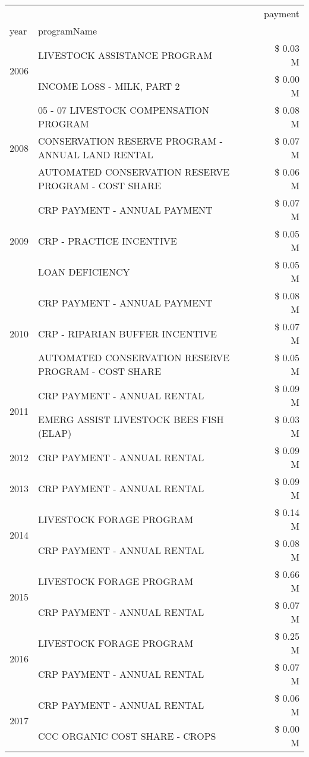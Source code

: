 \begin{tabular}{llr}
\toprule
 &  & payment \\
year & programName &  \\
\midrule
\multirow[t]{2}{*}{2006} & LIVESTOCK ASSISTANCE PROGRAM & \$ 0.03 M \\
 & INCOME LOSS - MILK, PART 2 & \$ 0.00 M \\
\cline{1-3}
\multirow[t]{3}{*}{2008} & 05 - 07 LIVESTOCK COMPENSATION PROGRAM & \$ 0.08 M \\
 & CONSERVATION RESERVE PROGRAM - ANNUAL LAND RENTAL & \$ 0.07 M \\
 & AUTOMATED CONSERVATION RESERVE PROGRAM - COST SHARE & \$ 0.06 M \\
\cline{1-3}
\multirow[t]{3}{*}{2009} & CRP PAYMENT - ANNUAL PAYMENT & \$ 0.07 M \\
 & CRP - PRACTICE INCENTIVE & \$ 0.05 M \\
 & LOAN DEFICIENCY & \$ 0.05 M \\
\cline{1-3}
\multirow[t]{3}{*}{2010} & CRP PAYMENT - ANNUAL PAYMENT & \$ 0.08 M \\
 & CRP - RIPARIAN BUFFER INCENTIVE & \$ 0.07 M \\
 & AUTOMATED CONSERVATION RESERVE PROGRAM - COST SHARE & \$ 0.05 M \\
\cline{1-3}
\multirow[t]{2}{*}{2011} & CRP PAYMENT - ANNUAL RENTAL & \$ 0.09 M \\
 & EMERG ASSIST LIVESTOCK BEES FISH (ELAP) & \$ 0.03 M \\
\cline{1-3}
2012 & CRP PAYMENT - ANNUAL RENTAL & \$ 0.09 M \\
\cline{1-3}
2013 & CRP PAYMENT - ANNUAL RENTAL & \$ 0.09 M \\
\cline{1-3}
\multirow[t]{2}{*}{2014} & LIVESTOCK FORAGE PROGRAM & \$ 0.14 M \\
 & CRP PAYMENT - ANNUAL RENTAL & \$ 0.08 M \\
\cline{1-3}
\multirow[t]{2}{*}{2015} & LIVESTOCK FORAGE PROGRAM & \$ 0.66 M \\
 & CRP PAYMENT - ANNUAL RENTAL & \$ 0.07 M \\
\cline{1-3}
\multirow[t]{2}{*}{2016} & LIVESTOCK FORAGE PROGRAM & \$ 0.25 M \\
 & CRP PAYMENT - ANNUAL RENTAL & \$ 0.07 M \\
\cline{1-3}
\multirow[t]{2}{*}{2017} & CRP PAYMENT - ANNUAL RENTAL & \$ 0.06 M \\
 & CCC ORGANIC COST SHARE - CROPS & \$ 0.00 M \\

\end{tabular}
